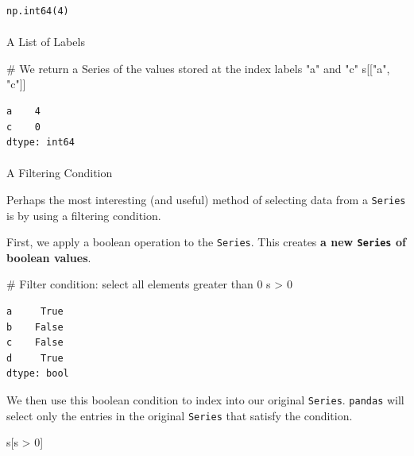 \documentclass[
  letterpaper,
  DIV=11,
  numbers=noendperiod]{scrreprt}
\makeatletter
\let\oldparagraph\paragraph
\renewcommand{\paragraph}{
    \@ifstar
      \xxxParagraphStar
      \xxxParagraphNoStar
  }
\newcommand{\xxxParagraphStar}[1]{\oldparagraph*{#1}\mbox{}}
\newcommand{\xxxParagraphNoStar}[1]{\oldparagraph{#1}\mbox{}}
\newenvironment{Shaded}{\begin{snugshade}}{\end{snugshade}}
\newcommand{\CommentTok}[1]{\textcolor[rgb]{0.37,0.37,0.37}{#1}}
\newcommand{\DecValTok}[1]{\textcolor[rgb]{0.68,0.00,0.00}{#1}}
\newcommand{\NormalTok}[1]{\textcolor[rgb]{0.00,0.23,0.31}{#1}}
\newcommand{\OperatorTok}[1]{\textcolor[rgb]{0.37,0.37,0.37}{#1}}
\newcommand{\StringTok}[1]{\textcolor[rgb]{0.13,0.47,0.30}{#1}}
\makeatother
\begin{document}
\begin{verbatim}
np.int64(4)
\end{verbatim}

\paragraph{A List of Labels}\label{a-list-of-labels}

\begin{Shaded}
\begin{Highlighting}[]
\CommentTok{\# We return a Series of the values stored at the index labels "a" and "c"}
\NormalTok{s[[}\StringTok{"a"}\NormalTok{, }\StringTok{"c"}\NormalTok{]] }
\end{Highlighting}
\end{Shaded}

\begin{verbatim}
a    4
c    0
dtype: int64
\end{verbatim}

\paragraph{A Filtering Condition}\label{a-filtering-condition}

Perhaps the most interesting (and useful) method of selecting data from
a \texttt{Series} is by using a filtering condition.

First, we apply a boolean operation to the \texttt{Series}. This creates
\textbf{a new \texttt{Series} of boolean values}.

\begin{Shaded}
\begin{Highlighting}[]
\CommentTok{\# Filter condition: select all elements greater than 0}
\NormalTok{s }\OperatorTok{\textgreater{}} \DecValTok{0} 
\end{Highlighting}
\end{Shaded}

\begin{verbatim}
a     True
b    False
c    False
d     True
dtype: bool
\end{verbatim}

We then use this boolean condition to index into our original
\texttt{Series}. \texttt{pandas} will select only the entries in the
original \texttt{Series} that satisfy the condition.

\begin{Shaded}
\begin{Highlighting}[]
\NormalTok{s[s }\OperatorTok{\textgreater{}} \DecValTok{0}\NormalTok{] }
\end{Highlighting}
\end{Shaded}
\end{document}
